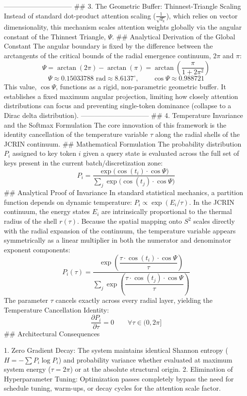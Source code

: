 ------------------------------
## 3. The Geometric Buffer: Thinnest-Triangle Scaling
Instead of standard dot-product attention scaling ($\frac{1}{\sqrt{d_k}}$), which relies on vector dimensionality, this mechanism scales attention weights globally via the angular constant of the Thinnest Triangle, $\Psi$.
## Analytical Derivation of the Global Constant
The angular boundary is fixed by the difference between the arctangents of the critical bounds of the radial emergence continuum, $2\pi$ and $\pi$:
$$\Psi = \arctan(2\pi) - \arctan(\pi) = \arctan\left(\frac{\pi}{1 + 2\pi^2}\right)$$ 
$$\Psi \approx 0.15033788 \text{ rad} \approx 8.6137^\circ, \qquad \cos\Psi \approx 0.988721$$ 
This value, $\cos\Psi$, functions as a rigid, non-parametric geometric buffer. It establishes a fixed maximum angular projection, limiting how closely attention distributions can focus and preventing single-token dominance (collapse to a Dirac delta distribution).
------------------------------
## 4. Temperature Invariance and the Softmax Formulation
The core innovation of this framework is the identity cancellation of the temperature variable $\tau$ along the radial shells of the JCRIN continuum.
## Mathematical Formulation
The probability distribution $P_i$ assigned to key token $i$ given a query state is evaluated across the full set of keys present in the current batch/discretization zone:
$$\boxed{P_i = \dfrac{\exp\bigl(\cos(t_i)\cdot\cos\Psi\bigr)}{\sum_j\exp\bigl(\cos(t_j)\cdot\cos\Psi\bigr)}}$$ 
## Analytical Proof of Invariance
In standard statistical mechanics, a partition function depends on dynamic temperature: $P_i \propto \exp(E_i / \tau)$.
In the JCRIN continuum, the energy states $E_i$ are intrinsically proportional to the thermal radius of the shell $r(\tau)$. Because the spatial mapping onto $S^2$ scales directly with the radial expansion of the continuum, the temperature variable appears symmetrically as a linear multiplier in both the numerator and denominator exponent components:
$$P_i(\tau) = \dfrac{\exp\left(\dfrac{\tau \cdot \cos(t_i) \cdot \cos\Psi}{\tau}\right)}{\sum_j\exp\left(\dfrac{\tau \cdot \cos(t_j) \cdot \cos\Psi}{\tau}\right)}$$ 
The parameter $\tau$ cancels exactly across every radial layer, yielding the Temperature Cancellation Identity:
$$\frac{\partial P_i}{\partial \tau} = 0 \qquad \forall \tau \in (0, 2\pi]$$ 
## Architectural Consequences

   1. Zero Gradient Decay: The system maintains identical Shannon entropy ($H = -\sum P_i \log P_i$) and probability variance whether evaluated at maximum system energy ($\tau = 2\pi$) or at the absolute structural origin.
   2. Elimination of Hyperparameter Tuning: Optimization passes completely bypass the need for schedule tuning, warm-ups, or decay cycles for the attention scale factor.

